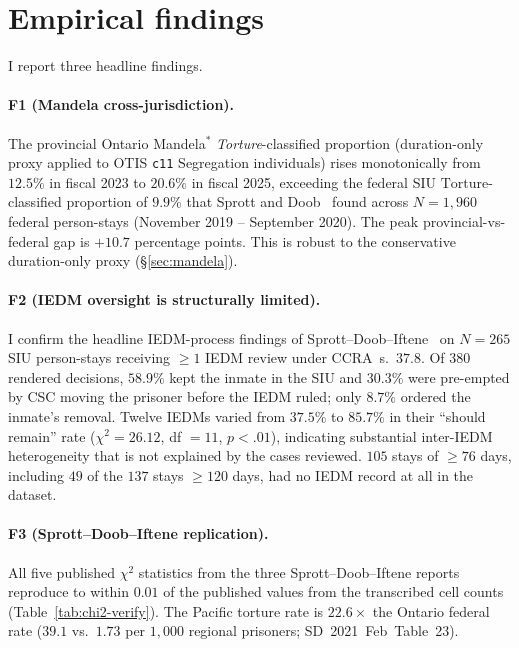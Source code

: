 \documentclass[11pt,a4paper]{article}
\theoremstyle{plain}
\theoremstyle{definition}
\theoremstyle{remark}
\begin{document}
\section{Empirical findings}
\label{sec:findings}

I report three headline findings.

\paragraph{F1 (Mandela cross-jurisdiction).}
The provincial Ontario Mandela$^{\ast}$ \emph{Torture}-classified
proportion (duration-only proxy applied to OTIS \texttt{c11}
Segregation individuals) rises monotonically from $12.5\%$ in
fiscal 2023 to $20.6\%$ in fiscal 2025, exceeding the federal
SIU $\mathrm{Torture}$-classified proportion of $9.9\%$
that Sprott and Doob~\cite{SprottDoob2021Torture} found across
$N = 1{,}960$ federal person-stays (November 2019 -- September
2020). The peak provincial-vs-federal gap is $+10.7$ percentage
points. This is robust to the conservative duration-only proxy
(\S\ref{sec:mandela}).

\paragraph{F2 (IEDM oversight is structurally limited).}
I confirm the headline IEDM-process findings of
Sprott--Doob--Iftene~\cite{SprottDoobIftene2021IEDM} on $N = 265$
SIU person-stays receiving $\geq 1$ IEDM review under
CCRA~s.~$37.8$. Of $380$ rendered decisions, $58.9\%$ kept the
inmate in the SIU and $30.3\%$ were pre-empted by CSC moving the
prisoner before the IEDM ruled; only $8.7\%$ ordered the inmate's
removal. Twelve IEDMs varied from $37.5\%$ to $85.7\%$ in their
``should remain'' rate ($\chi^{2} = 26.12$, df $= 11$, $p < .01$),
indicating substantial inter-IEDM heterogeneity that is not
explained by the cases reviewed. $105$ stays of $\geq 76$ days,
including $49$ of the $137$ stays $\geq 120$ days, had no IEDM
record at all in the dataset.

\paragraph{F3 (Sprott--Doob--Iftene replication).}
All five published $\chi^{2}$ statistics from the three
Sprott--Doob--Iftene reports reproduce to within $0.01$ of the
published values from the transcribed cell counts
(Table~\ref{tab:chi2-verify}). The Pacific torture rate is
$22.6\times$ the Ontario federal rate ($39.1$ vs.\ $1.73$ per
$1{,}000$ regional prisoners; SD~2021~Feb~Table~23).
\end{document}

